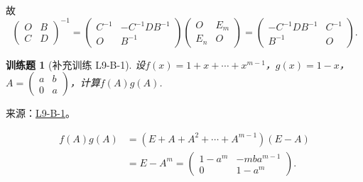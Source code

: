 \documentclass[UTF8,12pt,a4paper,fontset=fandol]{ctexart}
\newtheorem{exercise}{训练题}[section]
\begin{document}
\begin{solve}
\begin{enumerate}
                    故
                    \[
                        \begin{pmatrix}
                            O & B \\ C & D
                        \end{pmatrix}^{-1} = \begin{pmatrix}
                            C^{-1} & -C^{-1}DB^{-1} \\ O & B^{-1}
                        \end{pmatrix} \begin{pmatrix}
                            O & E_m \\ E_n & O
                        \end{pmatrix} = \begin{pmatrix}
                            -C^{-1}DB^{-1} & C^{-1} \\ B^{-1} & O
                        \end{pmatrix}.
                    \]

            \end{enumerate}
\end{solve}

\begin{exercise}[补充训练 L9-B-1]\label{prob:L9-B-1}
设$f(x)=1+x+\cdots+x^{m-1}$，$g(x)=1-x$，$A=\begin{pmatrix}
                a & b \\ 0 & a
            \end{pmatrix}$，计算$f(A)g(A)$.
\end{exercise}
\noindent 来源：\href{https://github.com/yhwu-is/Linear-Algebra-Left-Undone/blob/new/%E8%AE%B2%E4%B9%89/%E4%B8%93%E9%A2%98/9%20%E7%9F%A9%E9%98%B5%E8%BF%90%E7%AE%97%E8%BF%9B%E9%98%B6.tex}{L9-B-1}。
\begin{solve}
\begin{align*}
                f(A) g(A) & = (E + A + A^2 + \cdots + A^{m - 1})(E - A) \\
                          & = E - A^m = \begin{pmatrix}
                                            1 - a^m & -mba^{m - 1} \\
                                            0       & 1 - a^m
                                        \end{pmatrix}.
            \end{align*}
\end{solve}
\end{document}
